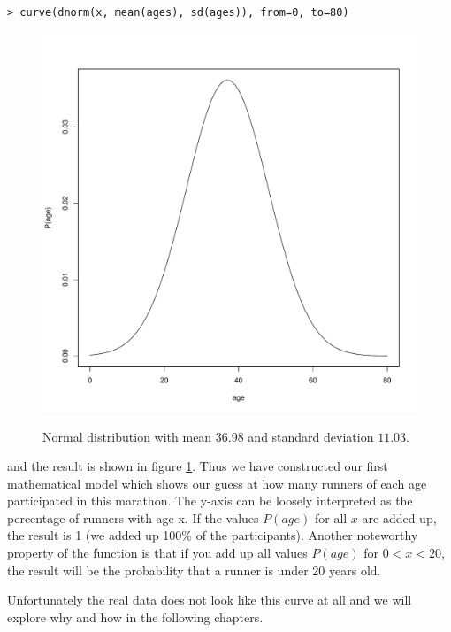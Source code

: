 \documentclass{tufte-book} %
\begin{document}
\begin{Verbatim}
> curve(dnorm(x, mean(ages), sd(ages)), from=0, to=80)
\end{Verbatim}

\begin{figure}
	\centering
	\includegraphics{graphics/plot-curve-ages}
	\label{img:plot-curve-ages}
	\caption{Normal distribution with mean $36.98$ and standard deviation $11.03$.}
\end{figure}

and the result is shown in figure \ref{img:plot-curve-ages}. Thus we have constructed our first mathematical model which shows our guess at how many runners of each age participated in this marathon. The y-axis can be loosely interpreted as the percentage of runners with age x. If the values $P(age)$ for all $x$ are added up, the result is 1 (we added up 100\% of the participants). Another noteworthy property of the function is that if you add up all values $P(age)$ for $0 < x < 20$, the result will be the probability that a runner is under 20 years old. 

Unfortunately the real data does not look like this curve at all and we will explore why and how in the following chapters.
\end{document}
